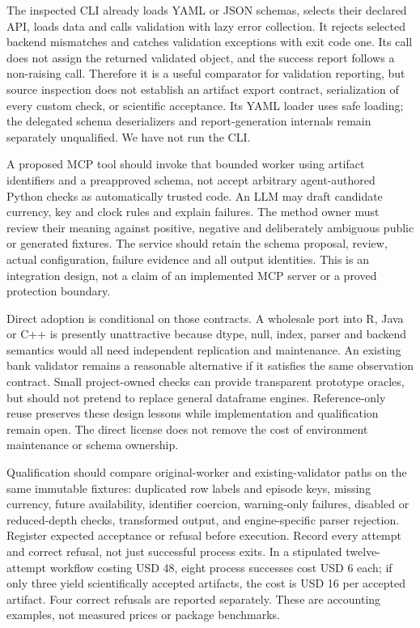 The inspected CLI already loads YAML or JSON schemas, selects their declared
API, loads data and calls validation with lazy error collection. It rejects
selected backend mismatches and catches validation exceptions with exit code
one. Its call does not assign the returned validated object, and the success
report follows a non-raising call. Therefore it is a useful comparator for
validation reporting, but source inspection does not establish an artifact
export contract, serialization of every custom check, or scientific acceptance.
Its YAML loader uses safe loading; the delegated schema deserializers and
report-generation internals remain separately unqualified. We have not run
the CLI.\citep{exec24_pandera_source}

A proposed MCP tool should invoke that bounded worker using artifact identifiers
and a preapproved schema, not accept arbitrary agent-authored Python checks as
automatically trusted code. An LLM may draft candidate currency, key and clock
rules and explain failures. The method owner must review their meaning against
positive, negative and deliberately ambiguous public or generated fixtures.
The service should retain the schema proposal, review, actual configuration,
failure evidence and all output identities. This is an integration design,
not a claim of an implemented MCP server or a proved protection boundary.

Direct adoption is conditional on those contracts. A wholesale port into R,
Java or C++ is presently unattractive because dtype, null, index, parser and
backend semantics would all need independent replication and maintenance.
An existing bank validator remains a reasonable alternative if it satisfies the
same observation contract. Small project-owned checks can provide transparent
prototype oracles, but should not pretend to replace general dataframe engines.
Reference-only reuse preserves these design lessons while implementation and
qualification remain open. The direct license does not remove the cost of
environment maintenance or schema ownership.\citep{exec24_pandera_source}

Qualification should compare original-worker and existing-validator paths on
the same immutable fixtures: duplicated row labels and episode keys, missing
currency, future availability, identifier coercion, warning-only failures,
disabled or reduced-depth checks, transformed output, and engine-specific
parser rejection. Register expected acceptance or refusal before execution.
Record every attempt and correct refusal, not just successful process exits.
In a stipulated twelve-attempt workflow costing USD 48, eight process successes
cost USD 6 each; if only three yield scientifically accepted artifacts, the cost
is USD 16 per accepted artifact. Four correct refusals are reported separately.
These are accounting examples, not measured prices or package benchmarks.
\citep{exec24_pandera_reference}

